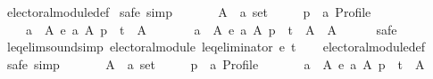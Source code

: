 \begin{isabellebody}
\ electoral{\isacharunderscore}{\kern0pt}module{\isacharunderscore}{\kern0pt}def\isanewline
{}\isamarkupfalse%
\ {\isacharparenleft}{\kern0pt}safe{\isacharcomma}{\kern0pt}\ simp{\isacharparenright}{\kern0pt}\isanewline
\ \ \isamarkupfalse%
\isanewline
\ \ \ \ A\ {\isacharcolon}{\kern0pt}{\isacharcolon}{\kern0pt}\ {\isachardoublequoteopen}{\isacharprime}{\kern0pt}a\ set{\isachardoublequoteclose}\ \isanewline
\ \ \ \ p\ {\isacharcolon}{\kern0pt}{\isacharcolon}{\kern0pt}\ {\isachardoublequoteopen}{\isacharprime}{\kern0pt}a\ Profile{\isachardoublequoteclose}\isanewline
\ \ \isamarkupfalse%
\isanewline
\ \ \ \ {\isachardoublequoteopen}{\isacharbraceleft}{\kern0pt}a\ {\isasymin}\ A{\isachardot}{\kern0pt}\ e\ a\ A\ p\ {\isacharless}{\kern0pt}\ t{\isacharbraceright}{\kern0pt}\ {\isasymnoteq}\ A\ {\isasymlongrightarrow}\isanewline
\ \ \ \ \ \ {\isacharbraceleft}{\kern0pt}a\ {\isasymin}\ A{\isachardot}{\kern0pt}\ e\ a\ A\ p\ {\isacharless}{\kern0pt}\ t{\isacharbraceright}{\kern0pt}\ {\isasymunion}\ A\ {\isacharequal}{\kern0pt}\ A{\isachardoublequoteclose}\isanewline
\ \ \ \ \isamarkupfalse%
\ safe\isanewline
{}\isamarkupfalse%
%
\endisatagproof
{\isafoldproof}%
%
\isadelimproof
\isanewline
%
\endisadelimproof
\isanewline
{}\isamarkupfalse%
\ leq{\isacharunderscore}{\kern0pt}elim{\isacharunderscore}{\kern0pt}sound{\isacharbrackleft}{\kern0pt}simp{\isacharbrackright}{\kern0pt}{\isacharcolon}{\kern0pt}\ {\isachardoublequoteopen}electoral{\isacharunderscore}{\kern0pt}module\ {\isacharparenleft}{\kern0pt}leq{\isacharunderscore}{\kern0pt}eliminator\ e\ t{\isacharparenright}{\kern0pt}{\isachardoublequoteclose}\isanewline
%
\isadelimproof
\ \ %
\endisadelimproof
%
\isatagproof
{}\isamarkupfalse%
\ electoral{\isacharunderscore}{\kern0pt}module{\isacharunderscore}{\kern0pt}def\isanewline
{}\isamarkupfalse%
\ {\isacharparenleft}{\kern0pt}safe{\isacharcomma}{\kern0pt}\ simp{\isacharparenright}{\kern0pt}\isanewline
\ \ \isamarkupfalse%
\isanewline
\ \ \ \ A\ {\isacharcolon}{\kern0pt}{\isacharcolon}{\kern0pt}\ {\isachardoublequoteopen}{\isacharprime}{\kern0pt}a\ set{\isachardoublequoteclose}\ \isanewline
\ \ \ \ p\ {\isacharcolon}{\kern0pt}{\isacharcolon}{\kern0pt}\ {\isachardoublequoteopen}{\isacharprime}{\kern0pt}a\ Profile{\isachardoublequoteclose}\isanewline
\ \ \isamarkupfalse%
\isanewline
\ \ \ \ {\isachardoublequoteopen}{\isacharbraceleft}{\kern0pt}a\ {\isasymin}\ A{\isachardot}{\kern0pt}\ e\ a\ A\ p\ {\isasymle}\ t{\isacharbraceright}{\kern0pt}\ {\isasymnoteq}\ A\ {\isasymlongrightarrow}\isanewline

\end{isabellebody}
